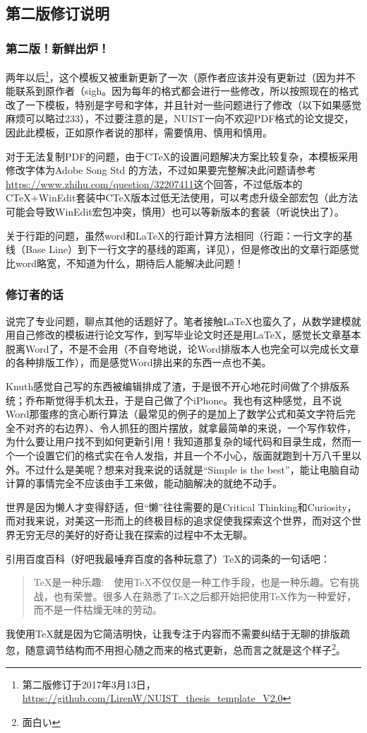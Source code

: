 \subsection*{第二版修订说明}

\subsubsection*{第二版！新鲜出炉！}

两年以后\footnote{第二版修订于2017年3月13日，\url{https://github.com/LirenW/NUIST_thesis_template_V2.0}}，这个模板又被重新更新了一次（原作者应该并没有更新过（因为并不能联系到原作者（sigh。因为每年的格式都会进行一些修改，所以按照现在的格式改了一下模板，特别是字号和字体，并且针对一些问题进行了修改（以下如果感觉麻烦可以略过233），不过要注意的是，NUIST一向不欢迎PDF格式的论文提交，因此此模板，正如原作者说的那样，需要慎用、慎用和慎用。\par
对于无法复制PDF的问题，由于CTeX的设置问题解决方案比较复杂，本模板采用修改字体为Adobe Song Std 的方法，不过如果要完整解决此问题请参考\url{https://www.zhihu.com/question/32207411}这个回答，不过低版本的CTeX+WinEdit套装中CTeX版本过低无法使用，可以考虑升级全部宏包（此方法可能会导致WinEdit宏包冲突，慎用）也可以等新版本的套装（听说快出了）。\par
关于行距的问题，虽然word和LaTeX的行距计算方法相同（行距：一行文字的基线（Base Line）到下一行文字的基线的距离，详见\cite{x4}），但是修改出的文章行距感觉比word略宽，不知道为什么，期待后人能解决此问题！\par

\subsubsection*{修订者的话}

说完了专业问题，聊点其他的话题好了。笔者接触LaTeX也蛮久了，从数学建模就用自己修改的模板进行论文写作，到写毕业论文时还是用LaTeX，感觉长文章基本脱离Word了，不是不会用（不自夸地说，论Word排版本人也完全可以完成长文章的各种排版工作），而是感觉Word排出来的东西一点也不美。\par
Knuth感觉自己写的东西被编辑排成了渣，于是很不开心地花时间做了个排版系统；乔布斯觉得手机太丑，于是自己做了个iPhone。我也有这种感觉，且不说Word那蛋疼的贪心断行算法（最常见的例子的是加上了数学公式和英文字符后完全不对齐的右边界）、令人抓狂的图片摆放，就拿最简单的来说，一个写作软件，为什么要让用户找不到如何更新引用！我知道那复杂的域代码和目录生成，然而一个一个设置它们的格式实在令人发指，并且一个不小心，版面就跑到十万八千里以外。不过什么是美呢？想来对我来说的话就是“Simple is the best”，能让电脑自动计算的事情完全不应该由手工来做，能动脑解决的就绝不动手。\par
世界是因为懒人才变得舒适，但“懒”往往需要的是Critical Thinking和Curiosity，而对我来说，对美这一形而上的终极目标的追求促使我探索这个世界，而对这个世界无穷无尽的美好的好奇让我在探索的过程中不太无聊。\par
引用百度百科（好吧我最唾弃百度的各种玩意了）TeX的词条的一句话吧：

\begin{quote}
  TeX是一种乐趣:　使用TeX不仅仅是一种工作手段，也是一种乐趣。它有挑战，也有荣誉。很多人在熟悉了TeX之后都开始把使用TeX作为一种爱好，而不是一件枯燥无味的劳动。
\end{quote}

我使用TeX就是因为它简洁明快，让我专注于内容而不需要纠结于无聊的排版疏忽，随意调节结构而不用担心随之而来的格式更新，总而言之就是这个样子\footnote{面白い}。\par